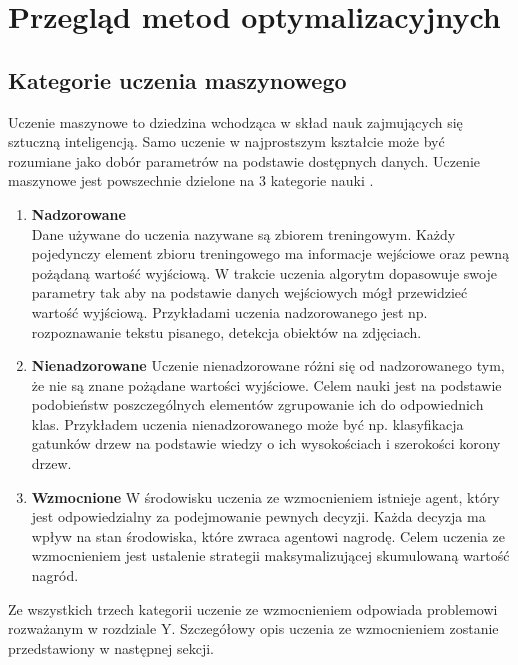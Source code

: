 \documentclass[12pt]{book}
\theoremstyle{plain}
\begin{document}


\chapter{Przegląd metod optymalizacyjnych}
\section{Kategorie uczenia maszynowego}
Uczenie maszynowe to dziedzina wchodząca w skład nauk zajmujących się sztuczną inteligencją. Samo uczenie w najprostszym kształcie może być rozumiane jako dobór parametrów na podstawie dostępnych danych. Uczenie maszynowe jest powszechnie dzielone na 3 kategorie nauki \cite{machineLearningClassification}.
\begin{enumerate}
\item \textbf{Nadzorowane} \\
Dane używane do uczenia nazywane są zbiorem treningowym. Każdy pojedynczy element zbioru treningowego ma informacje wejściowe oraz pewną pożądaną wartość wyjściową. W trakcie uczenia algorytm dopasowuje swoje parametry tak aby na podstawie danych wejściowych mógł przewidzieć wartość wyjściową. Przykładami uczenia nadzorowanego jest np. rozpoznawanie tekstu pisanego, detekcja obiektów na zdjęciach.
\item \textbf{Nienadzorowane}
Uczenie nienadzorowane różni się od nadzorowanego tym, że nie  są znane pożądane wartości wyjściowe. Celem nauki jest na podstawie podobieństw poszczególnych elementów zgrupowanie ich do odpowiednich klas. Przykładem uczenia nienadzorowanego może być np. klasyfikacja gatunków drzew na podstawie wiedzy o ich wysokościach i szerokości korony drzew.
\item \textbf{Wzmocnione}
W środowisku uczenia ze wzmocnieniem istnieje agent, który jest odpowiedzialny za podejmowanie pewnych decyzji. Każda decyzja ma wpływ na stan środowiska, które zwraca agentowi nagrodę. Celem uczenia ze wzmocnieniem jest ustalenie strategii maksymalizującej skumulowaną wartość nagród.
\end{enumerate}
Ze wszystkich trzech kategorii uczenie ze wzmocnieniem odpowiada problemowi rozważanym w rozdziale Y. Szczegółowy opis uczenia ze wzmocnieniem zostanie przedstawiony w następnej sekcji.
\end{document}

